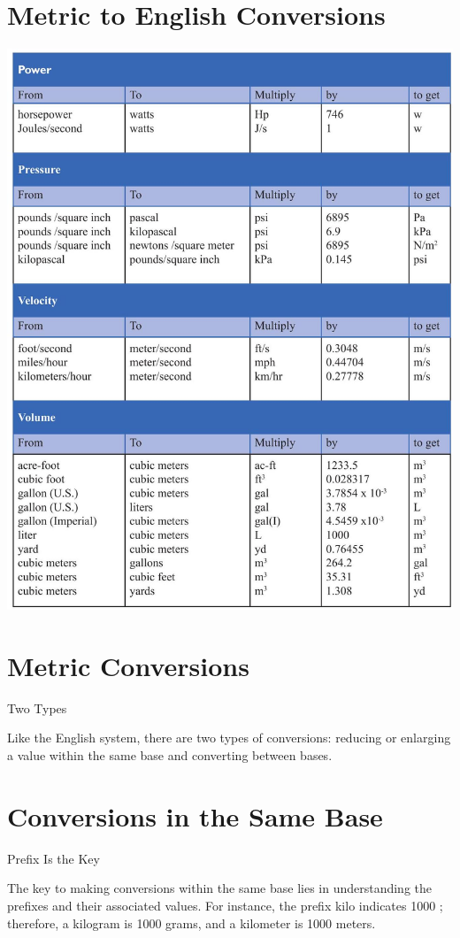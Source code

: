 \documentclass[10pt]{article}
\begin{document}
\section{Metric to English Conversions}
\includegraphics[max width=\textwidth]{2022_09_11_72dbedc910e6e984560cg-56}

\section{Metric Conversions}
Two Types

Like the English system, there are two types of conversions: reducing or enlarging a value within the same base and converting between bases.

\section{Conversions in the Same Base}
Prefix Is the Key

The key to making conversions within the same base lies in understanding the prefixes and their associated values. For instance, the prefix kilo indicates 1000 ; therefore, a kilogram is 1000 grams, and a kilometer is 1000 meters.
\end{document}
